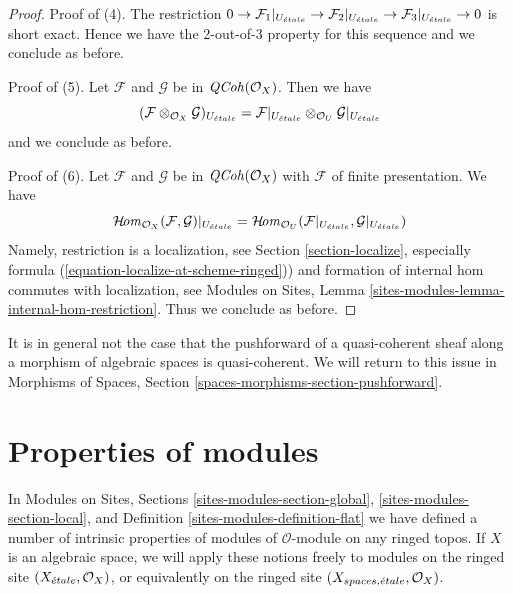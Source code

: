 \begin{proof}
\medskip\noindent
Proof of (4). The restriction
$0 \to \mathcal{F}_1|_{U_{\acute{e}tale}} \to \mathcal{F}_2|_{U_{\acute{e}tale}}
\to \mathcal{F}_3|_{U_{\acute{e}tale}} \to 0$
is short exact. Hence we have the 2-out-of-3 property
for this sequence and we conclude as before.

\medskip\noindent
Proof of (5). Let $\mathcal{F}$ and $\mathcal{G}$ be in $\mathit{QCoh}(\mathcal{O}_X)$.
Then we have
$$
(\mathcal{F} \otimes_{\mathcal{O}_X} \mathcal{G})_{U_{\acute{e}tale}} =
\mathcal{F}|_{U_{\acute{e}tale}} \otimes_{\mathcal{O}_U} \mathcal{G}|_{U_{\acute{e}tale}}
$$
and we conclude as before.

\medskip\noindent
Proof of (6). Let $\mathcal{F}$ and $\mathcal{G}$
be in $\mathit{QCoh}(\mathcal{O}_X)$ with $\mathcal{F}$
of finite presentation. We have
$$
\mathop{\mathcal{H}\!\mathit{om}}\nolimits_{\mathcal{O}_X}(\mathcal{F}, \mathcal{G})|_{U_{\acute{e}tale}} =
\mathop{\mathcal{H}\!\mathit{om}}\nolimits_{\mathcal{O}_U}(\mathcal{F}|_{U_{\acute{e}tale}}, \mathcal{G}|_{U_{\acute{e}tale}})
$$
Namely, restriction is a localization, see
Section \ref{section-localize}, especially formula
(\ref{equation-localize-at-scheme-ringed})) and formation of internal
hom commutes with localization, see
Modules on Sites, Lemma \ref{sites-modules-lemma-internal-hom-restriction}.
Thus we conclude as before.
\end{proof}

\noindent
It is in general not the case that the pushforward of a quasi-coherent sheaf
along a morphism of algebraic spaces is quasi-coherent. We will return to this
issue in
Morphisms of Spaces, Section \ref{spaces-morphisms-section-pushforward}.




\section{Properties of modules}
\label{section-properties-modules}

\noindent
In
Modules on Sites, Sections
\ref{sites-modules-section-global},
\ref{sites-modules-section-local}, and
Definition \ref{sites-modules-definition-flat}
we have defined a number of intrinsic properties of modules of
$\mathcal{O}$-module on any ringed topos. If $X$ is an algebraic
space, we will apply these notions freely to modules on the ringed
site $(X_{\acute{e}tale}, \mathcal{O}_X)$, or equivalently on the ringed site
$(X_{spaces, {\acute{e}tale}}, \mathcal{O}_X)$.

